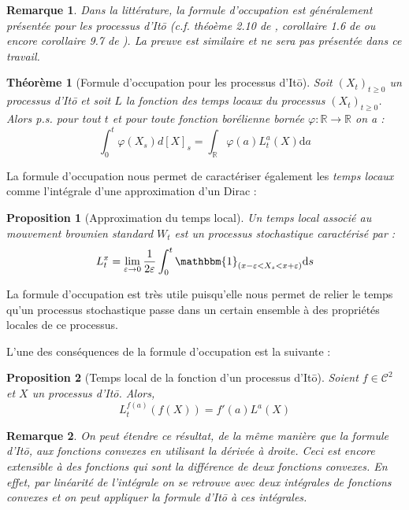 \documentclass[openany]{book}
\newcommand{\R}{\mathbb{R}}
\newcommand{\1}{\mathbbm{1}}
\renewcommand{\d}{\mathrm{d}}
\theoremstyle{thmfont}
\newtheorem{theorem}{Théorème}[chapter]
\theoremstyle{deffont}
\theoremstyle{thmfont}
\newtheorem{prop}[prop]{Proposition}
\theoremstyle{deffont}
\newtheorem{remark}[remark]{Remarque}
\begin{document}
\begin{remark}
  Dans la littérature, la formule d'occupation est généralement présentée pour les processus d'Itō (c.f. théoème 2.10 de \cite{zambotti}, corollaire 1.6 de \cite{revuz-yor} ou encore corollaire 9.7 de \cite{legall}). La preuve est similaire et ne sera pas présentée dans ce travail.
\end{remark}

\begin{theorem}[Formule d'occupation pour les processus d'Itō]
  Soit $(X_t)_{t\geq0}$ un processus d'Itō et soit $L$ la fonction des temps locaux du processus $(X_t)_{t\geq0}$. Alors p.s. pour tout $t$ et pour toute fonction borélienne bornée $\varphi : \R \rightarrow \R$ on a :
  \begin{equation}
    \int_0^t \varphi(X_s) d[X]_s = \int_\R \varphi(a) L_t^a(X)\d a
  \end{equation}
\end{theorem}

La formule d'occupation nous permet de caractériser également les \textit{temps locaux} comme l'intégrale d'une approximation d'un Dirac :

\begin{prop}[Approximation du temps local]
  \label{prop:caractTempsLoc}
  Un \textit{temps local} associé au mouvement brownien standard $W_t$ est un processus stochastique caractérisé par :
\begin{equation*}
  L_t^x = \lim_{\varepsilon \to 0} \frac{1}{2\varepsilon} \int_0^t \1_{(x - \varepsilon < X_s < x + \varepsilon)} \d s
\end{equation*}
\end{prop}

La formule d'occupation est très utile puisqu'elle nous permet de relier le temps qu’un processus stochastique passe dans un certain ensemble à des propriétés locales de ce processus.

L'une des conséquences de la formule d'occupation est la suivante :

\begin{prop}[Temps local de la fonction d'un processus d'Itō]
  Soient $f \in \mathcal C^2$ et $X$ un processus d'Itō. Alors,
  $$L_t^{f(a)}(f(X)) = f'(a) L^a(X)$$
\end{prop}

\begin{remark}
  On peut étendre ce résultat, de la même manière que la formule d'Itō, aux fonctions convexes en utilisant la dérivée à droite. Ceci est encore extensible à des fonctions qui sont la différence de deux fonctions convexes. En effet, par linéarité de l'intégrale on se retrouve avec deux intégrales de fonctions convexes et on peut appliquer la formule d'Itō à ces intégrales.
\end{remark}
\end{document}
